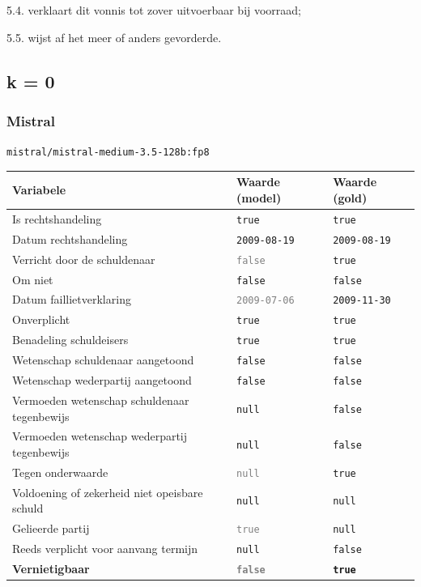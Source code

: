 \documentclass[
  dutch,
  a4paper,
]{article}
\begin{document}
5.4. verklaart dit vonnis tot zover uitvoerbaar bij voorraad;

5.5. wijst af het meer of anders gevorderde.

\newpage


\subsection{k = 0}\label{k-0-7}

\subsubsection{Mistral}\label{mistral-21}

\texttt{mistral/mistral-medium-3.5-128b:fp8}

\begin{center}
\small
\begin{tabular}{@{}p{7.4cm}p{2.6cm}p{2.6cm}@{}}
\toprule
Variabele & Waarde (model) & Waarde (gold) \\
\midrule
Is rechtshandeling & \texttt{true} & \texttt{true} \\
Datum rechtshandeling & \texttt{2009-08-19} & \texttt{2009-08-19} \\
Verricht door de schuldenaar & \textcolor{gray}{\texttt{false}} & \texttt{true} \\
Om niet & \texttt{false} & \texttt{false} \\
Datum faillietverklaring & \textcolor{gray}{\texttt{2009-07-06}} & \texttt{2009-11-30} \\
Onverplicht & \texttt{true} & \texttt{true} \\
Benadeling schuldeisers & \texttt{true} & \texttt{true} \\
Wetenschap schuldenaar aangetoond & \texttt{false} & \texttt{false} \\
Wetenschap wederpartij aangetoond & \texttt{false} & \texttt{false} \\
Vermoeden wetenschap schuldenaar tegenbewijs & \texttt{null} & \texttt{false} \\
Vermoeden wetenschap wederpartij tegenbewijs & \texttt{null} & \texttt{false} \\
Tegen onderwaarde & \textcolor{gray}{\texttt{null}} & \texttt{true} \\
Voldoening of zekerheid niet opeisbare schuld & \texttt{null} & \texttt{null} \\
Gelieerde partij & \textcolor{gray}{\texttt{true}} & \texttt{null} \\
Reeds verplicht voor aanvang termijn & \texttt{null} & \texttt{false} \\
\textbf{Vernietigbaar} & \textbf{\textcolor{gray}{\texttt{false}}} & \textbf{\texttt{true}} \\
\bottomrule
\end{tabular}
\end{center}
\end{document}
